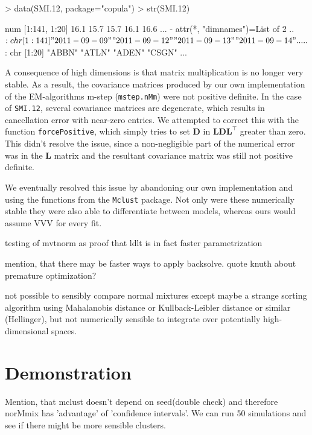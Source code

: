\begin{Schunk}
\begin{Sinput}
> data(SMI.12, package="copula")
> str(SMI.12)
\end{Sinput}
\begin{Soutput}
 num [1:141, 1:20] 16.1 15.7 15.7 16.1 16.6 ...
 - attr(*, "dimnames")=List of 2
  ..$ : chr [1:141] "2011-09-09" "2011-09-12" "2011-09-13" "2011-09-14" ...
  ..$ : chr [1:20] "ABBN" "ATLN" "ADEN" "CSGN" ...
\end{Soutput}
\end{Schunk}

A consequence of high dimensions is that matrix multiplication is no longer
very stable. As a result, the covariance matrices produced by our own 
implementation of the EM-algorithms m-step ({\tt mstep.nMm}) were not positive
definite.
In the case of {\tt SMI.12}, several covariance matrices are degenerate, which
results in cancellation error with near-zero entries.
We attempted to correct this with the function {\tt forcePositive}, which 
simply tries to set $\pmb{D}$ in $\pmb{LDL}^\top$ greater than zero.
This didn't resolve the issue, since a non-negligible part of the numerical
error was in the $\pmb{L}$ matrix and the resultant covariance matrix was still
not positive definite.

We eventually resolved this issue by abandoning our own implementation and 
using the functions from the {\tt Mclust} package. Not only were these 
numerically stable they were also able to differentiate between models, whereas
ours would assume VVV for every fit.

testing of mvtnorm as proof that ldlt is in fact faster parametrization

mention, that there may be faster ways to apply backsolve. 
quote knuth about premature optimization?

not possible to sensibly compare normal mixtures except maybe a strange sorting 
algorithm using Mahalanobis distance or Kullback-Leibler distance or similar
(Hellinger), but not numerically sensible to integrate over potentially 
high-dimensional spaces.



\section{Demonstration}

Mention, that mclust doesn't depend on seed(double check) and therefore norMmix has 
'advantage' of 'confidence intervals'. We can run 50 simulations and see if there
might be more sensible clusters.


